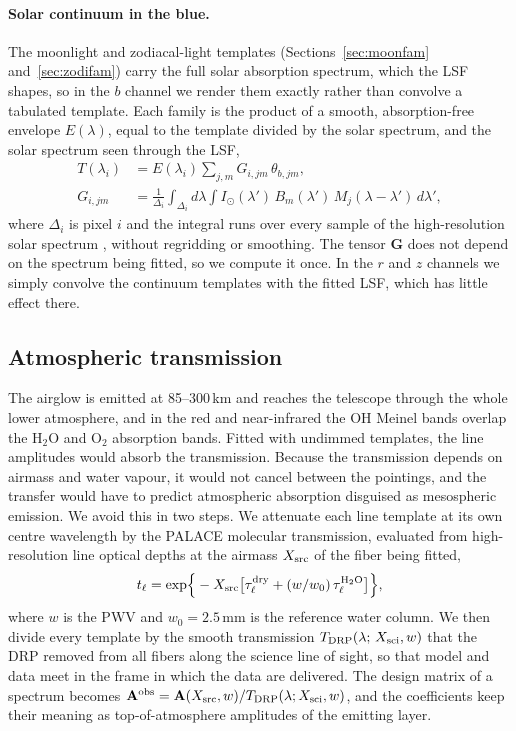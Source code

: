 \paragraph{Solar continuum in the blue.} The moonlight and zodiacal-light
templates (Sections~\ref{sec:moonfam} and~\ref{sec:zodifam}) carry the full
solar absorption spectrum, which the LSF shapes, so in the $b$ channel we
render them exactly rather than convolve a tabulated template. Each family
is the product of a smooth, absorption-free envelope $E(\lambda)$, equal to
the template divided by the solar spectrum, and the solar spectrum seen
through the LSF,
\begin{equation}
\begin{split}
  T(\lambda_i) &= E(\lambda_i)\sum_{j,m} G_{i,jm}\,\theta_{b,jm},\\
  G_{i,jm} &= \frac{1}{\Delta_i}\int_{\Delta_i}\!d\lambda
  \int\! I_\odot(\lambda')\,B_m(\lambda')\,M_j(\lambda-\lambda')\,d\lambda' ,
\end{split}
  \label{eq:solar}
\end{equation}
where $\Delta_i$ is pixel $i$ and the integral runs over every sample of the
high-resolution solar spectrum \citep{Meftah2018}, without regridding or
smoothing. The tensor $\mathbf{G}$ does not depend on the spectrum being
fitted, so we compute it once. In the $r$ and $z$ channels we simply convolve
the continuum templates with the fitted LSF, which has little effect there.

\subsection{Atmospheric transmission}
\label{sec:telluric}

The airglow is emitted at 85--300\,km and reaches the telescope through the
whole lower atmosphere, and in the red and near-infrared the OH Meinel bands
overlap the H$_2$O and O$_2$ absorption bands. Fitted with undimmed
templates, the line amplitudes would absorb the transmission. Because the
transmission depends on airmass and water vapour, it would not cancel
between the pointings, and the transfer would have to predict atmospheric
absorption disguised as mesospheric emission. We avoid this in two steps.
We attenuate each line template at its own centre wavelength by the PALACE
molecular transmission, evaluated from high-resolution line optical depths at
the airmass $X_{\rm src}$ of the fiber being fitted,
\begin{equation}
  t_\ell = \exp\!\Big\{-X_{\rm src}\big[\tau_\ell^{\rm dry}
  + (w/w_0)\,\tau_\ell^{\rm H_2O}\big]\Big\},
\end{equation}
where $w$ is the PWV and $w_0 = 2.5$\,mm is the reference water column.
We then divide every template by the smooth transmission
$T_{\rm DRP}(\lambda;\,X_{\rm sci},w)$ that the DRP removed from all fibers
along the science line of sight, so that model and data meet in the frame in
which the data are delivered. The design matrix of a spectrum becomes
$\mathbf{A}^{\rm obs} = \mathbf{A}(X_{\rm src}, w)/T_{\rm
DRP}(\lambda; X_{\rm sci}, w)$, and the coefficients keep their meaning as
top-of-atmosphere amplitudes of the emitting layer.

